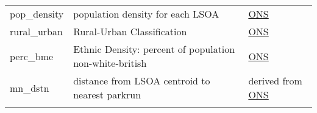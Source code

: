 \documentclass[]{article}
\begin{document}
\begin{longtable}[]{@{}lll@{}}
\begin{minipage}[t]{0.22\columnwidth}
pop\_density\strut
\end{minipage} & \begin{minipage}[t]{0.33\columnwidth}\raggedright
population density for each LSOA\strut
\end{minipage} & \begin{minipage}[t]{0.37\columnwidth}\raggedright
\href{https://www.ons.gov.uk/peoplepopulationandcommunity/populationandmigration/populationestimates/datasets/lowersuperoutputareapopulationdensity}{ONS}\strut
\end{minipage}\tabularnewline
\begin{minipage}[t]{0.22\columnwidth}\raggedright
rural\_urban\strut
\end{minipage} & \begin{minipage}[t]{0.33\columnwidth}\raggedright
Rural-Urban Classification\strut
\end{minipage} & \begin{minipage}[t]{0.37\columnwidth}\raggedright
\href{https://www.gov.uk/government/statistics/2011-rural-urban-classification-of-local-authority-and-other-higher-level-geographies-for-statistical-purposes}{ONS}\strut
\end{minipage}\tabularnewline
\begin{minipage}[t]{0.22\columnwidth}\raggedright
perc\_bme\strut
\end{minipage} & \begin{minipage}[t]{0.33\columnwidth}\raggedright
Ethnic Density: percent of population non-white-british\strut
\end{minipage} & \begin{minipage}[t]{0.37\columnwidth}\raggedright
\href{https://www.ons.gov.uk/peoplepopulationandcommunity/culturalidentity/ethnicity/datasets/2011censussmallpopulationtablesforenglandandwales}{ONS}\strut
\end{minipage}\tabularnewline
\begin{minipage}[t]{0.22\columnwidth}\raggedright
mn\_dstn\strut
\end{minipage} & \begin{minipage}[t]{0.33\columnwidth}\raggedright
distance from LSOA centroid to nearest parkrun\strut
\end{minipage} & \begin{minipage}[t]{0.37\columnwidth}\raggedright
derived from
\href{http://census.ukdataservice.ac.uk/get-data/boundary-data.aspx}{ONS}\strut
\end{minipage}\tabularnewline
\begin{minipage}[t]{0.22\columnwidth}\raggedright

\end{minipage}
\end{longtable}
\end{document}
